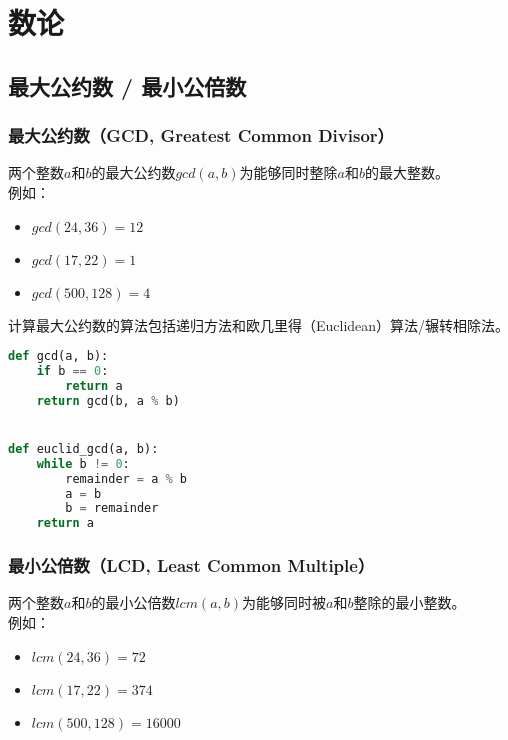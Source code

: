 \chapter{数论}

\section{最大公约数 / 最小公倍数}

\subsection{最大公约数（GCD, Greatest Common Divisor）}

两个整数$ a $和$ b $的最大公约数$ gcd(a, b) $为能够同时整除$ a $和$ b $的最大整数。\\

例如：

\begin{itemize}
    \item $ gcd(24, 36) = 12 $
    \item $ gcd(17, 22) = 1 $
    \item $ gcd(500, 128) = 4 $
\end{itemize}

计算最大公约数的算法包括递归方法和欧几里得（Euclidean）算法/辗转相除法。\\


\begin{lstlisting}[language=Python]
def gcd(a, b):
    if b == 0:
        return a
    return gcd(b, a % b)


def euclid_gcd(a, b):
    while b != 0:
        remainder = a % b
        a = b
        b = remainder
    return a
\end{lstlisting}

\vspace{0.5cm}

\subsection{最小公倍数（LCD, Least Common Multiple）}

两个整数$ a $和$ b $的最小公倍数$ lcm(a, b) $为能够同时被$ a $和$ b $整除的最小整数。\\

例如：

\begin{itemize}
    \item $ lcm(24, 36) = 72 $
    \item $ lcm(17, 22) = 374 $
    \item $ lcm(500, 128) = 16000 $
\end{itemize}

